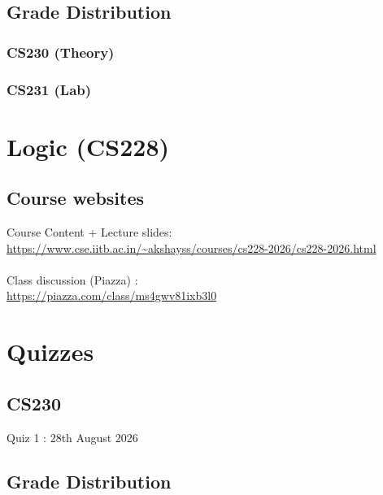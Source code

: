 \documentclass{article}
\begin{document}
    \subsection{Grade Distribution}

        \subsubsection{CS230 (Theory)}

        \subsubsection{CS231 (Lab)}

\pagebreak


\section{Logic (CS228)}

    \subsection{Course websites}
    Course Content + Lecture slides: \\\url{https://www.cse.iitb.ac.in/~akshayss/courses/cs228-2026/cs228-2026.html}
    \\\\
    Class discussion (Piazza) : \\\url{https://piazza.com/class/ms4gwv81ixb3l0}

    \section{Quizzes}

        \subsection{CS230}
        Quiz 1 : 28th August 2026
    \subsection{Grade Distribution}
\end{document}
